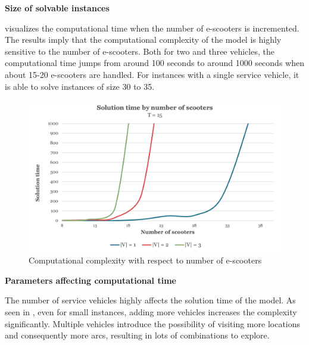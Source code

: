 \textbf{Size of solvable instances}

 visualizes the computational time when the number of e-scooters is incremented. The results imply that the computational complexity of the model is highly sensitive to the number of e-scooters. Both for two and three vehicles, the computational time jumps from around 100 seconds to around 1000 seconds when about 15-20 e-scooters are handled. For instances with a single service vehicle, it is able to solve instances of size 30 to 35. 
\\
\begin{figure}[H]
    \centering
    \includegraphics[width=0.8\columnwidth]{Images/Computational Study/size_of_solv_inst.png}
    \caption{Computational complexity with respect to number of e-scooters}
    \label{fig:size_solvable_sens_nodes}
\end{figure}

\textbf{Parameters affecting computational time}
    
The number of service vehicles highly affects the solution time of the model. As seen in , even for small instances, adding more vehicles increases the complexity significantly. Multiple vehicles introduce the possibility of visiting more locations and consequently more arcs, resulting in lots of combinations to explore. 

